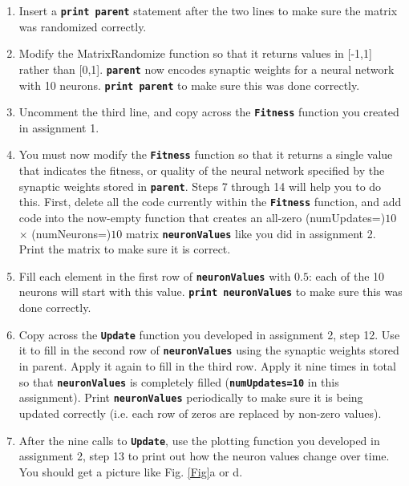 \documentclass[12pt]{article}
\begin{document}
\begin{enumerate}
\item Insert a \textbf{\texttt{print parent}} statement after the two lines to make sure the matrix was randomized correctly.

\item Modify the MatrixRandomize function so that it returns values in [-1,1] rather than [0,1]. \textbf{\texttt{parent}} now encodes synaptic weights for a neural network with 10 neurons. \textbf{\texttt{print parent}} to make sure this was done correctly.

\item Uncomment the third line, and copy across the \textbf{\texttt{Fitness}} function you created in assignment 1.

\item You must now modify the \textbf{\texttt{Fitness}} function so that it returns a single value that indicates the fitness, or quality of the neural network specified by the synaptic weights stored in \textbf{\texttt{parent}}. Steps 7 through 14 will help you to do this. First, delete all the code currently within the \textbf{\texttt{Fitness}} function, and add code into the now-empty function that creates an all-zero (numUpdates=)$10$ $\times$ (numNeurons=)$10$ matrix \textbf{\texttt{neuronValues}} like you did in assignment 2. Print the matrix to make sure it is correct.

\item Fill each element in the first row of \textbf{\texttt{neuronValues}} with $0.5$: each of the 10 neurons will start with this value. \textbf{\texttt{print neuronValues}} to make sure this was done correctly.

\item Copy across the \textbf{\texttt{Update}} function you developed in assignment 2, step 12. Use it to fill in the second row of \textbf{\texttt{neuronValues}} using the synaptic weights stored in parent. Apply it again to fill in the third row. Apply it nine times in total so that \textbf{\texttt{neuronValues}} is completely filled (\textbf{\texttt{numUpdates=10}} in this assignment). Print \textbf{\texttt{neuronValues}} periodically to make sure it is being updated correctly (i.e. each row of zeros are replaced by non-zero values).

\item After the nine calls to \textbf{\texttt{Update}}, use the plotting function you developed in assignment 2, step 13 to print out how the neuron values change over time. You should get a picture like Fig. \ref{Fig}a or d.


\end{enumerate}
\end{document}
